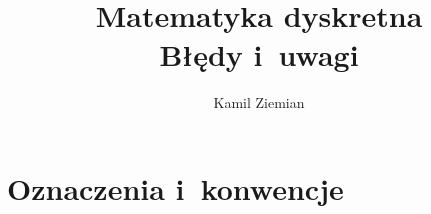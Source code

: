 \documentclass[a4paper,11pt]{article}
\title{Matematyka dyskretna \\
  {\Large Błędy i~uwagi}}
\author{Kamil Ziemian}
\numberwithin{equation}{section}
\begin{document}





\maketitle









\section{Oznaczenia i~konwencje}

\label{sec:Oznaczenia-i-konwencje}










\end{document}
